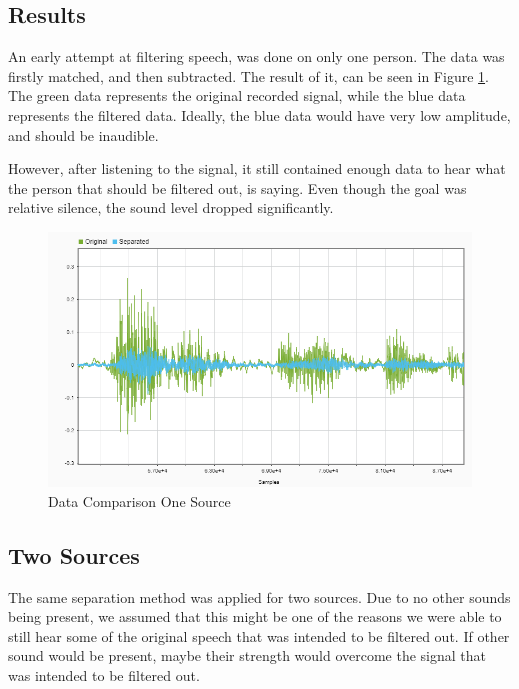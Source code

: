 \newpage
\subsection*{Results}
An early attempt at filtering speech, was done on only one person. The data was 
firstly matched, and then subtracted. The result of it, can be seen in Figure 
\ref{fig:oneSourceSepAndOG}. The green data represents the original recorded 
signal, while the blue data represents the filtered data. Ideally, the blue data 
would have very low amplitude, and should be inaudible.

However, after listening to the signal, it still contained enough data to hear what 
the person that should be filtered out, is saying. Even though the goal was 
relative silence, the sound level dropped significantly.

\begin{figure}[htp]
  \centering
  \includegraphics[width=\linewidth]{Illustrations/OnePersonOriginalAndSeparated.png}
  \caption{Data Comparison One Source}
  \label{fig:oneSourceSepAndOG}
\end{figure}

\newpage

\subsection{Two Sources}
The same separation method was applied for two sources. Due to no other sounds 
being present, we assumed that this might be one of the reasons we were able to 
still hear some of the original speech that was intended to be filtered out. If 
other sound would be present, maybe their strength would overcome the signal that 
was intended to be filtered out.\\


